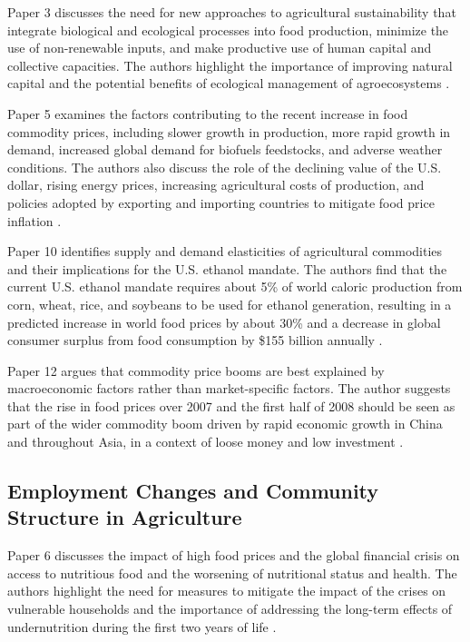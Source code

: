 \documentclass{article}
\begin{document}
Paper 3 discusses the need for new approaches to agricultural sustainability that integrate biological and ecological processes into food production, minimize the use of non-renewable inputs, and make productive use of human capital and collective capacities. The authors highlight the importance of improving natural capital and the potential benefits of ecological management of agroecosystems \cite{Kim2011TheCD}.

Paper 5 examines the factors contributing to the recent increase in food commodity prices, including slower growth in production, more rapid growth in demand, increased global demand for biofuels feedstocks, and adverse weather conditions. The authors also discuss the role of the declining value of the U.S. dollar, rising energy prices, increasing agricultural costs of production, and policies adopted by exporting and importing countries to mitigate food price inflation \cite{Chambers2000LocalityIT}.

Paper 10 identifies supply and demand elasticities of agricultural commodities and their implications for the U.S. ethanol mandate. The authors find that the current U.S. ethanol mandate requires about 5\% of world caloric production from corn, wheat, rice, and soybeans to be used for ethanol generation, resulting in a predicted increase in world food prices by about 30\% and a decrease in global consumer surplus from food consumption by \$155 billion annually \cite{Ding2010SocialMA}.

Paper 12 argues that commodity price booms are best explained by macroeconomic factors rather than market-specific factors. The author suggests that the rise in food prices over 2007 and the first half of 2008 should be seen as part of the wider commodity boom driven by rapid economic growth in China and throughout Asia, in a context of loose money and low investment \cite{Zhang2012ChinasIA}.

\subsection{Employment Changes and Community Structure in Agriculture}

Paper 6 discusses the impact of high food prices and the global financial crisis on access to nutritious food and the worsening of nutritional status and health. The authors highlight the need for measures to mitigate the impact of the crises on vulnerable households and the importance of addressing the long-term effects of undernutrition during the first two years of life \cite{Haidt2008PlanetOT}.
\end{document}
